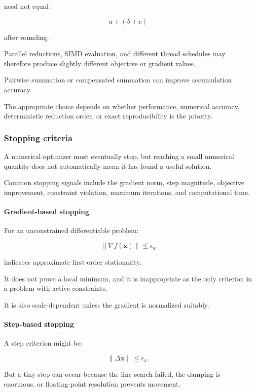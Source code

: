 need not equal:

\[
a+(b+c)
\]

after rounding.

Parallel reductions, SIMD evaluation, and different thread schedules may therefore produce slightly different objective or gradient values.

Pairwise summation or compensated summation can improve accumulation accuracy.

The appropriate choice depends on whether performance, numerical accuracy, deterministic reduction order, or exact reproducibility is the priority.

\subsubsection{Stopping criteria}\label{02-foundations-ii-ch027-stopping-criteria}

A numerical optimizer must eventually stop, but reaching a small numerical quantity does not automatically mean it has found a useful solution.

Common stopping signals include the gradient norm, step magnitude, objective improvement, constraint violation, maximum iterations, and computational time.

\paragraph{Gradient-based stopping}\label{02-foundations-ii-ch027-gradient-based-stopping}

For an unconstrained differentiable problem:

\[
\boxed{ \|\nabla f(\mathbf x)\|\le\epsilon_g }
\]

indicates approximate first-order stationarity.

It does not prove a local minimum, and it is inappropriate as the only criterion in a problem with active constraints.

It is also scale-dependent unless the gradient is normalized suitably.

\paragraph{Step-based stopping}\label{02-foundations-ii-ch027-step-based-stopping}

A step criterion might be:

\[
\|\Delta\mathbf x\| \le \epsilon_x.
\]

But a tiny step can occur because the line search failed, the damping is enormous, or floating-point resolution prevents movement.

